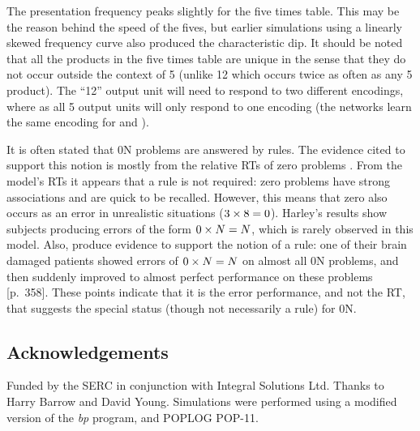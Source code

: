 The presentation frequency peaks slightly for the five times table. This
may be the reason behind the speed of the fives, but earlier simulations
using a linearly skewed
frequency curve also produced the characteristic dip.  It
should be noted that all the products in the five times table are unique in
the sense that they do not occur outside the context of 5 (unlike 12 which
occurs twice as often as any 5 product). The ``12'' output unit will need
to respond to two different encodings, where as all 5 output units will
only respond to one encoding (the networks learn the same encoding for
 and ).

It is often stated that \x0N problems are answered by rules. The
evidence cited to support this notion is mostly from the relative RTs of
zero problems \cite{millcogn,staznetw}. From the model's RTs it appears
that a rule is not required: zero problems have strong associations and are
quick to be recalled. However, this means that zero also occurs as an error
in unrealistic situations ($\mbox{$3\times8$}=0$).  Harley's \citeyear{harlasso} results
show subjects producing errors of the form $\mbox{$0\times N$}=N$, which is rarely
observed in this model.  Also,  produce evidence to support
the notion of a rule: one of their brain damaged patients showed errors of
$\mbox{$0\times N$}=N$ on almost all \x0N problems, and then suddenly improved to almost
perfect performance on these problems [p.~358]. These points indicate that
it is the error performance, and not the RT, that suggests the special
status (though not necessarily a rule) for \x0N.

\subsection*{Acknowledgements} Funded by the SERC in conjunction with
Integral Solutions Ltd. Thanks to Harry Barrow and David Young. Simulations
were performed using a modified version of the  {\em bp}
program, and POPLOG POP-11.


